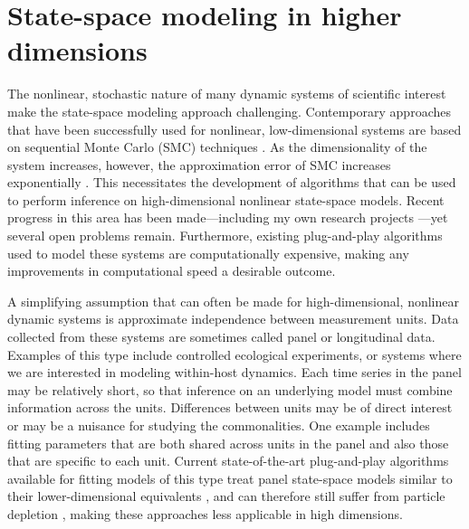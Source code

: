 \documentclass{article}
\begin{document}

\section{State-space modeling in higher dimensions}\label{sec:methods}

The nonlinear, stochastic nature of many dynamic systems of scientific interest make the state-space modeling approach challenging.
Contemporary approaches that have been successfully used for nonlinear, low-dimensional systems are based on sequential Monte Carlo (SMC) techniques \cite{ionides06,andrieu10,ionides15}.
As the dimensionality of the system increases, however, the approximation error of SMC increases exponentially \cite{bengtsson08,snyder08}.
This necessitates the development of algorithms that can be used to perform inference on high-dimensional nonlinear state-space models.
Recent progress in this area has been made---including my own research projects \cite{ionides22,wheeler24,panelpomp}---yet several open problems remain.
Furthermore, existing plug-and-play algorithms used to model these systems are computationally expensive, making any improvements in computational speed a desirable outcome.

A simplifying assumption that can often be made for high-dimensional, nonlinear dynamic systems is approximate independence between measurement units.
Data collected from these systems are sometimes called panel or longitudinal data.
Examples of this type include controlled ecological experiments, or systems where we are interested in modeling within-host dynamics.
Each time series in the panel may be relatively short, so that inference on an underlying model must combine information across the units.
Differences between units may be of direct interest or may be a nuisance for studying the commonalities.
One example includes fitting parameters that are both shared across units in the panel and also those that are specific to each unit.
Current state-of-the-art plug-and-play algorithms available for fitting models of this type treat panel state-space models similar to their lower-dimensional equivalents \cite{breto20}, and can therefore still suffer from particle depletion \cite{snyder08}, making these approaches less applicable in high dimensions.
\end{document}
